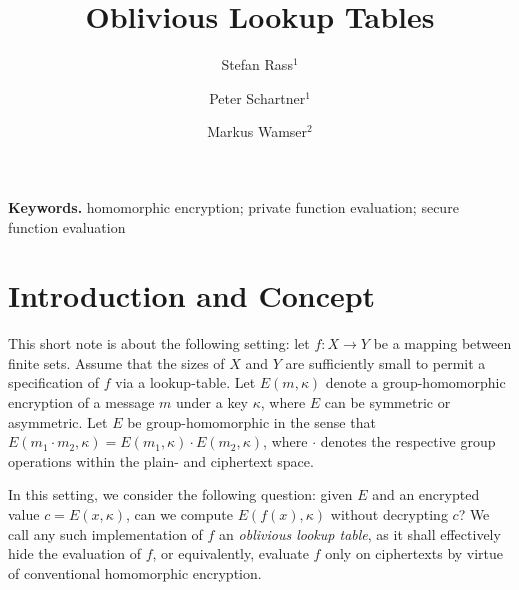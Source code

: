 \documentclass{llncs}
\begin{document}
\title{Oblivious Lookup Tables}

\author{Stefan Rass$^1$\and Peter Schartner$^1$\and Markus Wamser$^2$}


\maketitle              {}

\noindent\textbf{Keywords.} homomorphic encryption; private function
evaluation; secure function evaluation



\section{Introduction and Concept}
This short note is about the following setting: let $f:X\to Y$ be a mapping
between finite sets. Assume that the sizes of $X$ and $Y$ are sufficiently
small to permit a specification of $f$ via a lookup-table. Let $E(m,\kappa)$
denote a group-homomorphic encryption of a message $m$ under a key $\kappa$,
where $E$ can be symmetric or asymmetric. Let $E$ be group-homomorphic in the
sense that $E(m_1\cdot m_2,\kappa)=E(m_1,\kappa)\cdot E(m_2,\kappa)$, where
$\cdot$ denotes the respective group operations within the plain- and
ciphertext space.

In this setting, we consider the following question: given $E$ and an
encrypted value $c=E(x,\kappa)$, can we compute $E(f(x),\kappa)$ without
decrypting $c$? We call any such implementation of $f$ an \emph{oblivious
lookup table}, as it shall effectively hide the evaluation of $f$, or
equivalently, evaluate $f$ only on ciphertexts by virtue of conventional
homomorphic encryption.
\end{document}
